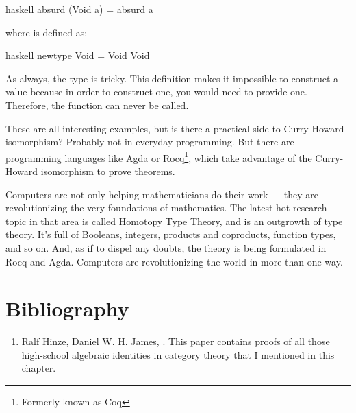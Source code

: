 \begin{snip}{haskell}
absurd (Void a) = absurd a
\end{snip}
where  is defined as:

\begin{snip}{haskell}
newtype Void = Void Void
\end{snip}
As always, the type  is tricky. This definition makes it
impossible to construct a value because in order to construct one, you
would need to provide one. Therefore, the function  can
never be called.

These are all interesting examples, but is there a practical side to
Curry-Howard isomorphism? Probably not in everyday programming. But
there are programming languages like Agda or Rocq\footnote{Formerly known as Coq}, which take advantage
of the Curry-Howard isomorphism to prove theorems.

Computers are not only helping mathematicians do their work --- they are
revolutionizing the very foundations of mathematics. The latest hot
research topic in that area is called Homotopy Type Theory, and is an
outgrowth of type theory. It's full of Booleans, integers, products and
coproducts, function types, and so on. And, as if to dispel any doubts,
the theory is being formulated in Rocq and Agda. Computers are
revolutionizing the world in more than one way.

\section{Bibliography}

\begin{enumerate}
  \tightlist
  \item
        Ralf Hinze, Daniel W. H. James,
        . This paper contains proofs of all those high-school
        algebraic identities in category theory that I mentioned in this
        chapter.
\end{enumerate}
